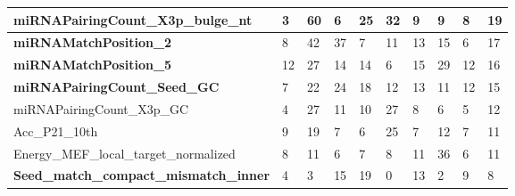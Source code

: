 \documentclass{bmcart}
\begin{document}
\begin{table}[h!]
\begin{tabular}{|l|l|l|l|l|l|l|l|l|l|}
miRNAPairingCount\_X3p\_bulge\_nt                 & 3            & 60           & 6            & 25          & 32          & 9           & 9           & 8           & 19            \\ \hline
\textbf{miRNAMatchPosition\_2}                    & 8            & 42           & 37           & 7           & 11          & 13          & 15          & 6           & 17            \\ \hline
\textbf{miRNAMatchPosition\_5}                    & 12           & 27           & 14           & 14          & 6           & 15          & 29          & 12          & 16            \\ \hline
\textbf{miRNAPairingCount\_Seed\_GC}              & 7            & 22           & 24           & 18          & 12          & 13          & 11          & 12          & 15            \\ \hline
miRNAPairingCount\_X3p\_GC                        & 4            & 27           & 11           & 10          & 27          & 8           & 6           & 5           & 12            \\ \hline
Acc\_P21\_10th                                    & 9            & 19           & 7            & 6           & 25          & 7           & 12          & 7           & 11            \\ \hline
Energy\_MEF\_local\_target\_normalized            & 8            & 11           & 6            & 7           & 8           & 11          & 36          & 6           & 11            \\ \hline
\textbf{Seed\_match\_compact\_mismatch\_inner}    & 4            & 3            & 15           & 19          & 0           & 13          & 2           & 9           & 8             \\ \hline
\end{tabular}
\end{table}
\end{document}
